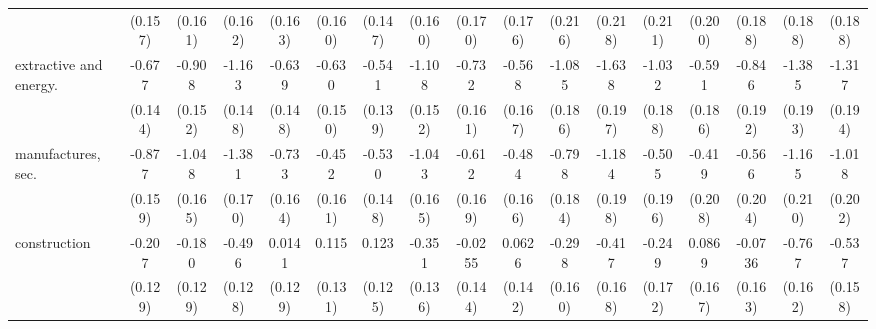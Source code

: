 {\begin{tabular}{l*{16}{c}}
                    &     (0.157)         &     (0.161)         &     (0.162)         &     (0.163)         &     (0.160)         &     (0.147)         &     (0.160)         &     (0.170)         &     (0.176)         &     (0.216)         &     (0.218)         &     (0.211)         &     (0.200)         &     (0.188)         &     (0.188)         &     (0.188)         \\
[1em]
extractive and energy.&      -0.677\sym{***}&      -0.908\sym{***}&      -1.163\sym{***}&      -0.639\sym{***}&      -0.630\sym{***}&      -0.541\sym{***}&      -1.108\sym{***}&      -0.732\sym{***}&      -0.568\sym{***}&      -1.085\sym{***}&      -1.638\sym{***}&      -1.032\sym{***}&      -0.591\sym{**} &      -0.846\sym{***}&      -1.385\sym{***}&      -1.317\sym{***}\\
                    &     (0.144)         &     (0.152)         &     (0.148)         &     (0.148)         &     (0.150)         &     (0.139)         &     (0.152)         &     (0.161)         &     (0.167)         &     (0.186)         &     (0.197)         &     (0.188)         &     (0.186)         &     (0.192)         &     (0.193)         &     (0.194)         \\
[1em]
manufactures, sec.  &      -0.877\sym{***}&      -1.048\sym{***}&      -1.381\sym{***}&      -0.733\sym{***}&      -0.452\sym{**} &      -0.530\sym{***}&      -1.043\sym{***}&      -0.612\sym{***}&      -0.484\sym{**} &      -0.798\sym{***}&      -1.184\sym{***}&      -0.505\sym{**} &      -0.419\sym{*}  &      -0.566\sym{**} &      -1.165\sym{***}&      -1.018\sym{***}\\
                    &     (0.159)         &     (0.165)         &     (0.170)         &     (0.164)         &     (0.161)         &     (0.148)         &     (0.165)         &     (0.169)         &     (0.166)         &     (0.184)         &     (0.198)         &     (0.196)         &     (0.208)         &     (0.204)         &     (0.210)         &     (0.202)         \\
[1em]
construction        &      -0.207         &      -0.180         &      -0.496\sym{***}&      0.0141         &       0.115         &       0.123         &      -0.351\sym{**} &     -0.0255         &      0.0626         &      -0.298         &      -0.417\sym{*}  &      -0.249         &      0.0869         &     -0.0736         &      -0.767\sym{***}&      -0.537\sym{***}\\
                    &     (0.129)         &     (0.129)         &     (0.128)         &     (0.129)         &     (0.131)         &     (0.125)         &     (0.136)         &     (0.144)         &     (0.142)         &     (0.160)         &     (0.168)         &     (0.172)         &     (0.167)         &     (0.163)         &     (0.162)         &     (0.158)         \\

\end{tabular}}
